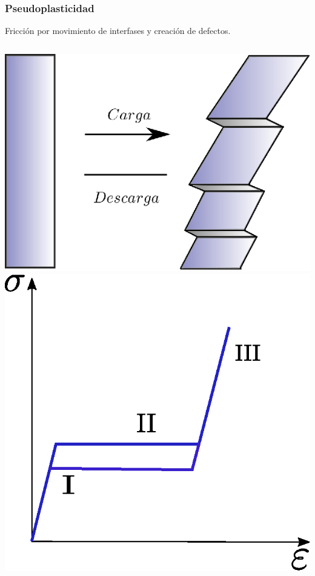 \documentclass[usenames,dvipsnames]{beamer}
\begin{document}
\begin{frame}

\frametitle{Pseudoplasticidad}


Fricción por movimiento de interfases y creación de defectos.

\vfill

\begin{columns}
\includegraphics[width=\columnwidth]{img/intro/HisteresisEsquema.eps}
\includegraphics[width=\columnwidth]{img/intro/Histeresis.eps}
 
\end{columns}

\end{frame}
\end{document}
